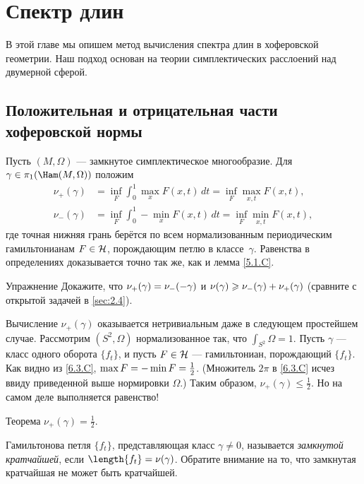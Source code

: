 \chapter{Спектр длин}\label{chap:9}

В этой главе мы опишем метод вычисления спектра длин в хоферовской геометрии.
Наш подход основан на теории симплектических расслоений над двумерной сферой.

\section{Положительная и отрицательная части хоферовской нормы}

Пусть $(M, \Omega)$ — замкнутое симплектическое многообразие.
Для $\gamma \in \pi_1 (\Ham(M, \Omega))$ положим \index[symb]{$\nu_\pm$}
\begin{align*}
\nu_+ (\gamma) &= \inf_F \int_0^1 \max_x F (x, t)\,dt = \inf_F \max_{x,t}F (x, t),
\\ 
\nu_- (\gamma) &= \inf_F \int_0^1 -\min_x F (x, t)\,dt = \inf_F \min_{x,t}F (x, t),
\end{align*}
где точная нижняя грань берётся по всем нормализованным периодическим
гамильтонианам $F \in \mathcal{H}$, порождающим петлю в классе~$\gamma$. 
Равенства в определениях доказывается точно так же, как и лемма \ref{5.1.C}.

\begin{ex*}{Упражнение}
Докажите, что $\nu_+ (\gamma) \z= \nu_- (-\gamma)$ и $\nu(\gamma) \z\ge
\nu_- (\gamma) \z+ \nu_+ (\gamma)$ 
(сравните с открытой задачей в \ref{sec:2.4}).
\end{ex*}

Вычисление $\nu_+ (\gamma)$ оказывается нетривиальным даже в следующем
простейшем случае. 
Рассмотрим $(S^2, \Omega)$ нормализованное так, что $\int_{S^2} \Omega = 1$.
Пусть $\gamma$ — класс одного оборота $\{f_t\}$, и пусть $F \in \mathcal{H}$
— гамильтониан, порождающий $\{f_t\}$. 
Как видно из \ref{6.3.C}, $\max F \z= - \min F = \frac12$.
(Множитель $2\pi$ в \ref{6.3.C} исчез ввиду приведенной выше
нормировки $\Omega$.) 
Таким образом, $\nu_+ (\gamma) \le \frac12$.
Но на самом деле выполняется равенство!

\begin{thm}{Теорема}\label{9.1.A}
$\nu_+ (\gamma) = \frac12$.
\end{thm}

Гамильтонова петля $\{f_t \}$, представляющая класс $\gamma \ne 0$,
называется \emph{замкнутой кратчайшей}, если $\length\{f_t \} =
\nu(\gamma)$.
Обратите внимание на то, что замкнутая кратчайшая не может быть
кратчайшей.

